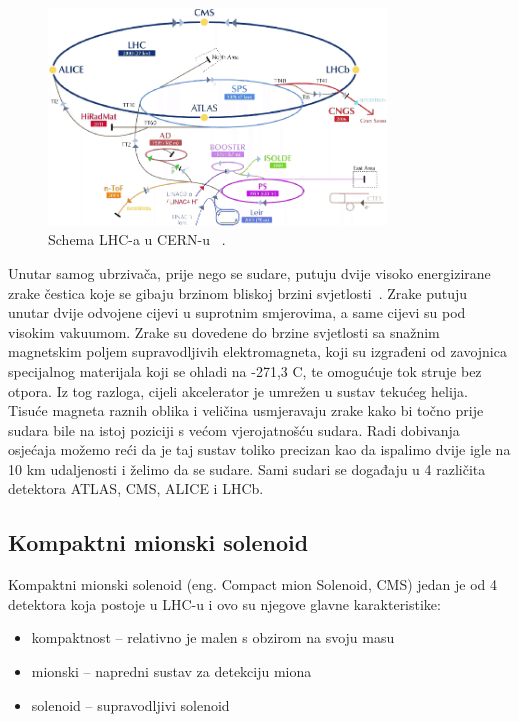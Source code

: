 \documentclass[12pt,a4paper,oneside]{article}
\begin{document}
\begin{linenumbers}
		\begin{figure}[H]
			\centering
			\includegraphics[width=0.8\textwidth]{schema-lhc.png}
			\caption[Schema LHC-a u CERN-u.]{\label{sl:schema-lhc}Schema LHC-a u CERN-u ~\cite{doktorat}. }
		\end{figure}
		Unutar samog ubrzivača, prije nego se sudare, putuju dvije visoko energizirane zrake čestica koje se gibaju brzinom bliskoj brzini svjetlosti~\cite{cern-lhc}. Zrake putuju unutar dvije odvojene cijevi u suprotnim smjerovima, a same cijevi su pod visokim vakuumom. Zrake su dovedene do brzine svjetlosti sa snažnim magnetskim poljem supravodljivih elektromagneta, koji su izgrađeni od zavojnica specijalnog materijala koji se ohladi na -271,3 \degree C, te omogućuje tok struje bez otpora. Iz tog razloga, cijeli akcelerator je umrežen u sustav tekućeg helija. Tisuće magneta raznih oblika i veličina usmjeravaju zrake kako bi točno prije sudara bile na istoj poziciji s većom vjerojatnošću sudara. Radi dobivanja osjećaja možemo reći da je taj sustav toliko precizan kao da ispalimo dvije igle na 10 km udaljenosti i želimo da se sudare.
		Sami sudari se događaju u 4 različita detektora ATLAS, CMS, ALICE i LHCb.
		
		\subsection{Kompaktni mionski solenoid}
		Kompaktni mionski solenoid (eng. Compact mion Solenoid, CMS) jedan je od 4 detektora koja postoje u LHC-u i ovo su njegove glavne karakteristike:
		\begin{itemize}
			\item kompaktnost – relativno je malen s obzirom na svoju masu
			\item mionski – napredni sustav za detekciju miona
			\item solenoid – supravodljivi solenoid
		\end{itemize}
	

\end{linenumbers}
\end{document}

